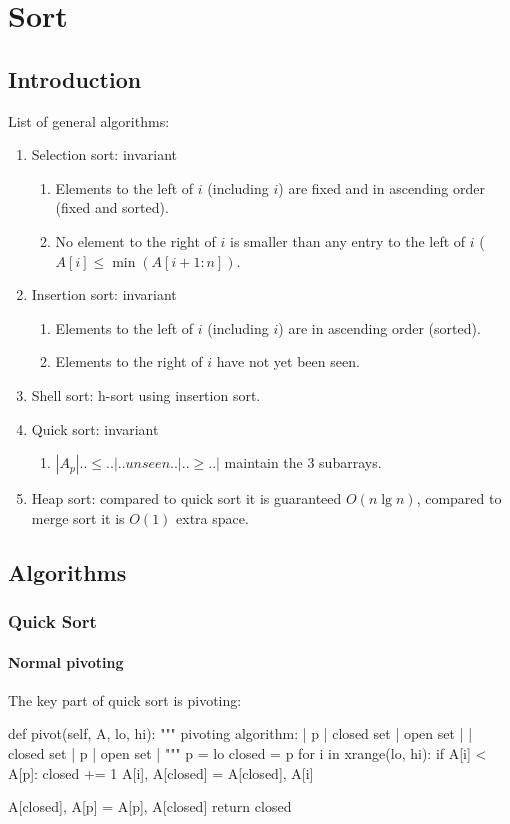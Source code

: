 \chapter{Sort}


\section{Introduction}
List of general algorithms:
\begin{enumerate}
\item Selection sort: invariant
\begin{enumerate}
\item Elements to the left of $i$ (including $i$) are fixed and in ascending order (fixed and sorted).
\item No element to the right of $i$ is smaller than any entry to the left of $i$ ($A[i]  \leq\min(A[i+1:n])$.
\end{enumerate}
\item Insertion sort: invariant
\begin{enumerate}
\item Elements to the left of $i$ (including $i$) are in ascending order (sorted).
\item Elements to the right of $i$ have not yet been seen.
\end{enumerate}
\item Shell sort: h-sort using insertion sort.
\item Quick sort: invariant
\begin{enumerate}
\item $|A_p|..\leq..|..unseen..|..\geq..|$ maintain the 3 subarrays.
\end{enumerate}
\item Heap sort: compared to quick sort it is guaranteed $O(n \lg n)$, compared to merge sort it is $O(1)$ extra space. 
\end{enumerate}

\section{Algorithms}
\subsection{Quick Sort}
\subsubsection{Normal pivoting}\label{section:pivot}
The key part of quick sort is pivoting:
\newpage
\begin{python}
def pivot(self, A, lo, hi):
    """
    pivoting algorithm:
    | p | closed set | open set |
    | closed set | p | open set |
    """
    p = lo
    closed = p
    for i in xrange(lo, hi):
        if A[i] < A[p]:
            closed += 1
            A[i], A[closed] = A[closed], A[i]

    A[closed], A[p] = A[p], A[closed]
    return closed
\end{python}


